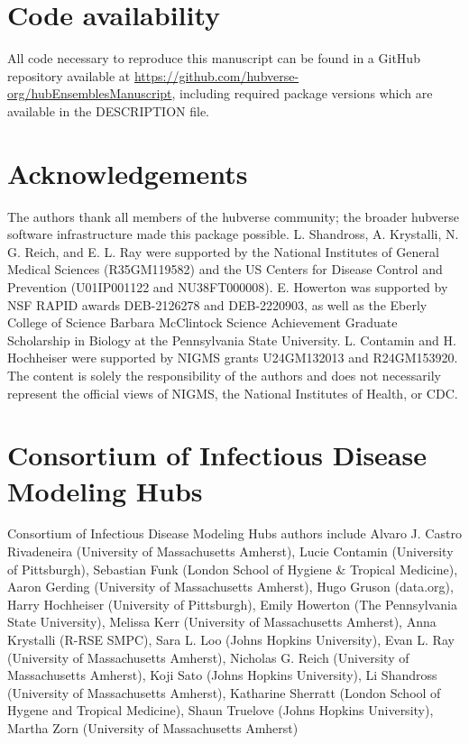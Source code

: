 \documentclass[
]{article}
\begin{document}
\section*{Code availability}\label{code-availability}

All code necessary to reproduce this manuscript can be found in a GitHub
repository available at
\url{https://github.com/hubverse-org/hubEnsemblesManuscript}, including
required package versions which are available in the DESCRIPTION file.

\section*{Acknowledgements}\label{acknowledgements}

The authors thank all members of the hubverse community; the broader
hubverse software infrastructure made this package possible. L.
Shandross, A. Krystalli, N. G. Reich, and E. L. Ray were supported by
the National Institutes of General Medical Sciences (R35GM119582) and
the US Centers for Disease Control and Prevention (U01IP001122 and
NU38FT000008). E. Howerton was supported by NSF RAPID awards DEB-2126278
and DEB-2220903, as well as the Eberly College of Science Barbara
McClintock Science Achievement Graduate Scholarship in Biology at the
Pennsylvania State University. L. Contamin and H. Hochheiser were
supported by NIGMS grants U24GM132013 and R24GM153920. The content is
solely the responsibility of the authors and does not necessarily
represent the official views of NIGMS, the National Institutes of
Health, or CDC.

\section*{Consortium of Infectious Disease Modeling
Hubs}\label{consortium-of-infectious-disease-modeling-hubs}

Consortium of Infectious Disease Modeling Hubs authors include Alvaro J.
Castro Rivadeneira (University of Massachusetts Amherst), Lucie Contamin
(University of Pittsburgh), Sebastian Funk (London School of Hygiene \&
Tropical Medicine), Aaron Gerding (University of Massachusetts Amherst),
Hugo Gruson (data.org), Harry Hochheiser (University of Pittsburgh),
Emily Howerton (The Pennsylvania State University), Melissa Kerr
(University of Massachusetts Amherst), Anna Krystalli (R-RSE SMPC), Sara
L. Loo (Johns Hopkins University), Evan L. Ray (University of
Massachusetts Amherst), Nicholas G. Reich (University of Massachusetts
Amherst), Koji Sato (Johns Hopkins University), Li Shandross (University
of Massachusetts Amherst), Katharine Sherratt (London School of Hygene
and Tropical Medicine), Shaun Truelove (Johns Hopkins University),
Martha Zorn (University of Massachusetts Amherst)
\end{document}
